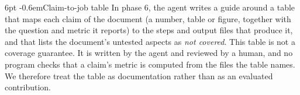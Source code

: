 \documentclass[pdflatex,sn-mathphys-num]{sn-jnl}
\makeatletter
\theoremstyle{thmstyletwo}%
\theoremstyle{thmstylethree}%
\newcommand{\tool}{\texttt{use-hpc}}
\newcommand{\code}[1]{\texttt{#1}}
\renewcommand\paragraph{\@startsection{paragraph}{4}{\z@}%
  {6pt \@plus 2pt \@minus 1pt}{-0.6em}{\normalfont\normalsize\bfseries}}
\makeatother
\begin{document}
\paragraph{Claim-to-job table} In phase 6, the agent writes a guide around a table that maps each claim of the document (a number, table or figure, together with the question and metric it reports) to the steps and output files that produce it, and that lists the document's untested aspects as \emph{not covered}. This table is not a coverage guarantee. It is written by the agent and reviewed by a human, and no program checks that a claim's metric is computed from the files the table names. We therefore treat the table as documentation rather than as an evaluated contribution. %



\end{document}
